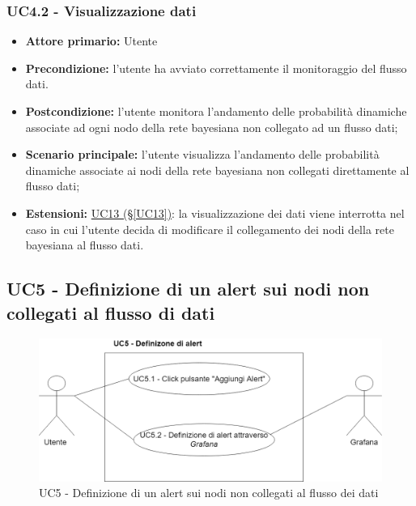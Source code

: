 \subsubsection{UC4.2 - Visualizzazione dati}\label{UC4.2}
\begin{itemize}
\item \textbf{Attore primario:} Utente
\item \textbf{Precondizione:} l'utente ha avviato correttamente il monitoraggio del flusso dati.
\item \textbf{Postcondizione:} l'utente monitora l'andamento delle probabilità dinamiche associate ad ogni nodo della rete bayesiana non collegato ad un flusso dati;
\item \textbf{Scenario principale:} l'utente visualizza l'andamento delle probabilità dinamiche associate ai nodi 			della rete bayesiana non collegati direttamente al flusso dati;
\item \textbf{Estensioni:} \hyperref[UC13]{UC13 (§\ref*{UC13})}: la visualizzazione dei dati viene interrotta nel 			caso in cui l'utente decida di modificare il collegamento dei nodi della rete bayesiana al flusso dati.
\end{itemize}

\newpage

\subsection{UC5 - Definizione di un alert sui nodi non collegati al flusso di dati}\label{UC5}

\begin{figure}[H]
	\centering
	\includegraphics[scale=0.3]{./images/UC5.png}
	\caption{UC5 - Definizione di un alert sui nodi non collegati al flusso dei dati}
\end{figure}

